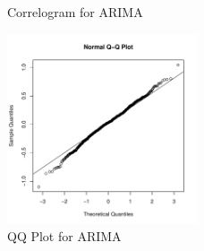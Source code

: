 \documentclass[11pt, a4paper]{article} %
\begin{document}
\begin{figure}[ht]
\begin{center}
\qquad
{}
\qquad
{}
\end{center}
\caption{Correlogram for ARIMA}
\label{corarima}
\end{figure}



\begin{figure}[H]
\begin{center}
\includegraphics[width=0.5\textwidth]{alleselena-qqarima.pdf}
\caption{QQ Plot for ARIMA}
\label{qqarima}
\end{center}
\end{figure}
\end{document}
